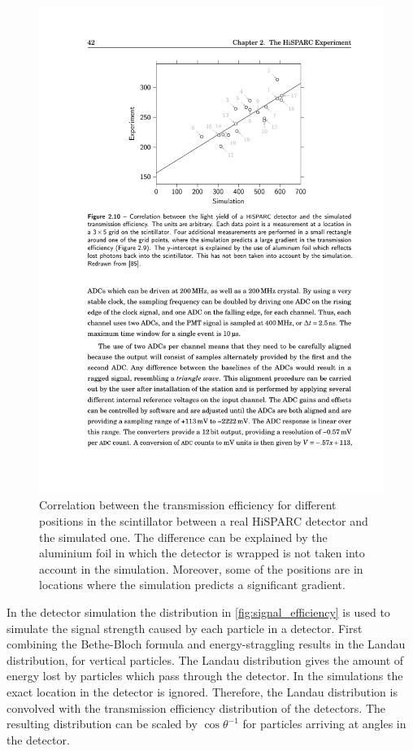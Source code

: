 \begin{figure}
    \centering
    \includegraphics{plots/detector/scintilator_transmission_compared}
    \caption{Correlation between the transmission efficiency for different positions in the scintillator between a real HiSPARC detector and the simulated one. The difference can be explained by the aluminium foil in which the detector is wrapped is not taken into account in the simulation. Moreover, some of the positions are in locations where the simulation predicts a significant gradient.}
    \label{fig:scintilator_transmission_compared}
\end{figure}

In the detector simulation the distribution in \cref{fig:signal_efficiency} is used to simulate the signal strength caused by each particle in a detector. First combining the Bethe-Bloch formula and energy-straggling results in the Landau distribution, for vertical particles. The Landau distribution gives the amount of energy lost by particles which pass through the detector. In the simulations the exact location in the detector is ignored. Therefore, the Landau distribution is convolved with the transmission efficiency distribution of the detectors. The resulting distribution can be scaled by $\cos{\theta}^{-1}$ for particles arriving at angles in the detector.

